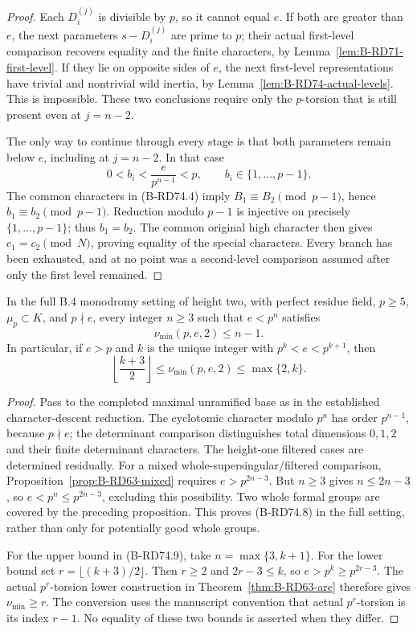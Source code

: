 \begin{proof}
Each \(D_i^{(j)}\) is divisible by \(p\), so it cannot equal
\(e\). If both are greater than \(e\), the next parameters
\(s-D_i^{(j)}\) are prime to \(p\); their actual first-level
comparison recovers equality and the finite characters, by
Lemma~\ref{lem:B-RD71-first-level}. If they lie on opposite
sides of \(e\), the next first-level representations have
trivial and nontrivial wild inertia, by
Lemma~\ref{lem:B-RD74-actual-levels}. This is impossible.
These two conclusions require only the \(p\)-torsion that is
still present even at \(j=n-2\).

The only way to continue through every stage is that both
parameters remain below \(e\), including at \(j=n-2\).
In that case
\[
 0<b_i<\frac{e}{p^{n-1}}<p,
 \qquad b_i\in\{1,\ldots,p-1\}.
 \tag{B-RD74.7}
\]
The common characters in (B-RD74.4) imply
\(B_1\equiv B_2\pmod{p-1}\), hence
\(b_1\equiv b_2\pmod{p-1}\). Reduction modulo \(p-1\) is
injective on precisely \(\{1,\ldots,p-1\}\); thus
\(b_1=b_2\). The common original high character then gives
\(c_1=c_2\pmod N\), proving equality of the special
characters. Every branch has been exhausted, and at no point
was a second-level comparison assumed after only the first
level remained.
\end{proof}

\begin{theorem}
\label{thm:B-RD74-upper}
In the full B.4 monodromy setting of height two, with perfect
residue field, \(p\ge5\), \(\mu_p\subset K\), and \(p\nmid e\),
every integer \(n\ge3\) such that \(e<p^n\) satisfies
\[
 \nu_{\min}(p,e,2)\le n-1.
 \tag{B-RD74.8}
\]
In particular, if \(e>p\) and \(k\) is the unique integer
with \(p^k<e<p^{k+1}\), then
\[
 \left\lfloor\frac{k+3}{2}\right\rfloor
 \le \nu_{\min}(p,e,2)\le\max\{2,k\}.
 \tag{B-RD74.9}
\]
\end{theorem}
\begin{proof}
Pass to the completed maximal unramified base as in the
established character-descent reduction. The cyclotomic
character modulo \(p^n\) has order \(p^{n-1}\), because
\(p\nmid e\); the determinant comparison distinguishes total
dimensions \(0,1,2\) and their finite determinant characters.
The height-one filtered cases are determined residually.
For a mixed whole-supersingular/filtered comparison,
Proposition~\ref{prop:B-RD63-mixed} requires
\(e>p^{2n-3}\). But \(n\ge3\) gives \(n\le2n-3\), so
\(e<p^n\le p^{2n-3}\), excluding this possibility.
Two whole formal groups are covered by the preceding
proposition. This proves (B-RD74.8) in the full setting,
rather than only for potentially good whole groups.

For the upper bound in (B-RD74.9), take
\(n=\max\{3,k+1\}\). For the lower bound set
\(r=\lfloor(k+3)/2\rfloor\). Then \(r\ge2\) and
\(2r-3\le k\), so \(e>p^k\ge p^{2r-3}\).
The actual \(p^r\)-torsion lower construction in
Theorem~\ref{thm:B-RD63-arc} therefore gives
\(\nu_{\min}\ge r\). The conversion uses the manuscript
convention that actual \(p^r\)-torsion is its index \(r-1\).
No equality of these two bounds is asserted when they differ.
\end{proof}

